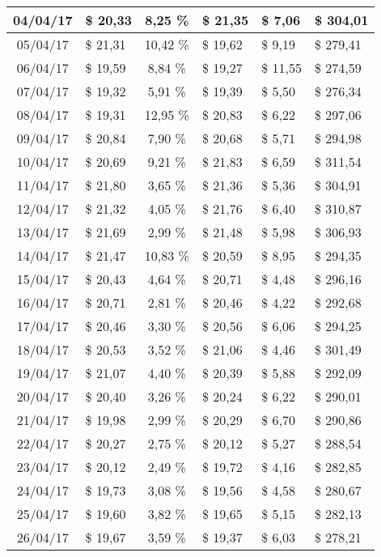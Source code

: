 \begin{center}
\begin{small}
\begin{longtable}{|c|l|c|l|l|l|}
04/04/17 & \$ 20,33 & 8,25 \% & \$ 21,35 & \$ 7,06 & \$ 304,01 \\ \hline
05/04/17 & \$ 21,31 & 10,42 \% & \$ 19,62 & \$ 9,19 & \$ 279,41 \\ \hline
06/04/17 & \$ 19,59 & 8,84 \% & \$ 19,27 & \$ 11,55 & \$ 274,59 \\ \hline
07/04/17 & \$ 19,32 & 5,91 \% & \$ 19,39 & \$ 5,50 & \$ 276,34 \\ \hline
08/04/17 & \$ 19,31 & 12,95 \% & \$ 20,83 & \$ 6,22 & \$ 297,06 \\ \hline
09/04/17 & \$ 20,84 & 7,90 \% & \$ 20,68 & \$ 5,71 & \$ 294,98 \\ \hline
10/04/17 & \$ 20,69 & 9,21 \% & \$ 21,83 & \$ 6,59 & \$ 311,54 \\ \hline
11/04/17 & \$ 21,80 & 3,65 \% & \$ 21,36 & \$ 5,36 & \$ 304,91 \\ \hline
12/04/17 & \$ 21,32 & 4,05 \% & \$ 21,76 & \$ 6,40 & \$ 310,87 \\ \hline
13/04/17 & \$ 21,69 & 2,99 \% & \$ 21,48 & \$ 5,98 & \$ 306,93 \\ \hline
14/04/17 & \$ 21,47 & 10,83 \% & \$ 20,59 & \$ 8,95 & \$ 294,35 \\ \hline
15/04/17 & \$ 20,43 & 4,64 \% & \$ 20,71 & \$ 4,48 & \$ 296,16 \\ \hline
16/04/17 & \$ 20,71 & 2,81 \% & \$ 20,46 & \$ 4,22 & \$ 292,68 \\ \hline
17/04/17 & \$ 20,46 & 3,30 \% & \$ 20,56 & \$ 6,06 & \$ 294,25 \\ \hline
18/04/17 & \$ 20,53 & 3,52 \% & \$ 21,06 & \$ 4,46 & \$ 301,49 \\ \hline
19/04/17 & \$ 21,07 & 4,40 \% & \$ 20,39 & \$ 5,88 & \$ 292,09 \\ \hline
20/04/17 & \$ 20,40 & 3,26 \% & \$ 20,24 & \$ 6,22 & \$ 290,01 \\ \hline
21/04/17 & \$ 19,98 & 2,99 \% & \$ 20,29 & \$ 6,70 & \$ 290,86 \\ \hline
22/04/17 & \$ 20,27 & 2,75 \% & \$ 20,12 & \$ 5,27 & \$ 288,54 \\ \hline
23/04/17 & \$ 20,12 & 2,49 \% & \$ 19,72 & \$ 4,16 & \$ 282,85 \\ \hline
24/04/17 & \$ 19,73 & 3,08 \% & \$ 19,56 & \$ 4,58 & \$ 280,67 \\ \hline
25/04/17 & \$ 19,60 & 3,82 \% & \$ 19,65 & \$ 5,15 & \$ 282,13 \\ \hline
26/04/17 & \$ 19,67 & 3,59 \% & \$ 19,37 & \$ 6,03 & \$ 278,21 \\ \hline

\end{longtable}
\end{small}
\end{center}
